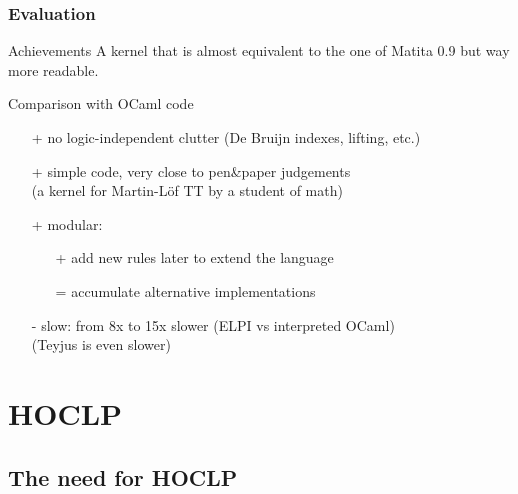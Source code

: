 \documentclass{beamer}
\begin{document}
\begin{frame}[fragile]
\frametitle{Evaluation}
 \begin{block}{Achievements}
  A \alert{kernel} that is \alert{almost equivalent} to the one of Matita 0.9
  but way more readable.
 \end{block}

 \begin{block}{Comparison with OCaml code}
  \begin{itemize}
  \item[+] \alert{no} logic-independent \alert{clutter} (De Bruijn indexes, lifting, etc.)
  \item[+] \alert{simple code}, very close to pen\&paper judgements\\
    (a kernel for Martin-L\"of TT by a student of math)
  \item[+] \alert{modular}:
   \begin{itemize}
     \item[+] add new rules later to extend the language
     \item[=] accumulate alternative implementations
   \end{itemize}
  \item[-] \alert{slow:} from 8x to 15x slower (\alert{ELPI vs interpreted OCaml})\\
   (Teyjus is even slower)
  \end{itemize}
 \end{block}
\end{frame}

\section{HOCLP}

\subsection{The need for HOCLP}
\end{document}
